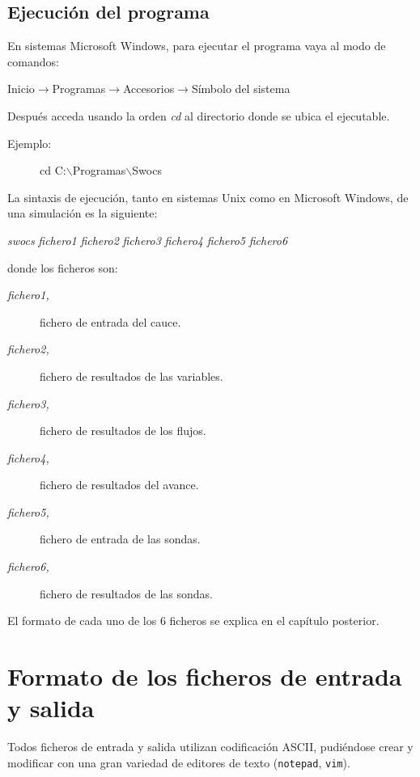\documentclass[a4paper,12pt]{report}
\begin{document}
\section{Ejecución del programa}

En sistemas Microsoft Windows, para ejecutar el programa vaya al modo de comandos:
\begin{description}
\item[Inicio$\rightarrow$Programas$\rightarrow$Accesorios$\rightarrow$Símbolo del sistema]
\end{description}
Después acceda usando la orden \emph{cd} al directorio donde se ubica el ejecutable.
\begin{description}
\item[Ejemplo:] cd C:$\backslash$Programas$\backslash$Swocs
\end{description}

La sintaxis de ejecución, tanto en sistemas Unix como en Microsoft Windows, de una simulación es la siguiente:
\begin{description}
\item \emph{swocs}  \emph{fichero1} \emph{fichero2} \emph{fichero3} \emph{fichero4} \emph{fichero5} \emph{fichero6}
\end{description}
donde los ficheros son:
\begin{description}
\item[\it fichero1,] fichero de entrada del cauce.
\item[\it fichero2,] fichero de resultados de las variables.
\item[\it fichero3,] fichero de resultados de los flujos.
\item[\it fichero4,] fichero de resultados del avance.
\item[\it fichero5,] fichero de entrada de las sondas.
\item[\it fichero6,] fichero de resultados de las sondas.
\end{description}

El formato de cada uno de los 6 ficheros se explica en el capítulo posterior.

\chapter{Formato de los ficheros de entrada y salida}

Todos ficheros de entrada y salida utilizan codificación ASCII, pudiéndose crear y modificar 
con una gran variedad de editores de texto ({\tt notepad}, {\tt vim}).
\end{document}
